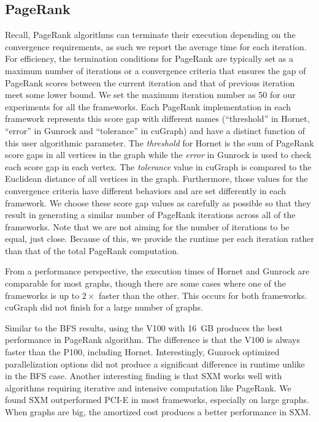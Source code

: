 \subsection{PageRank}
Recall, PageRank algorithms can terminate their execution depending on the convergence requirements, as such we report the average time for each iteration.
For efficiency, the termination conditions for PageRank are typically set as a maximum number of iterations or a convergence criteria that ensures the gap of PageRank scores between the current iteration and that of previous iteration meet some lower bound. We set the maximum iteration number as 50 for our experiments for all the frameworks.
Each PageRank implementation in each framework represents this score gap with different names (``threshold'' in Hornet, ``error'' in Gunrock and ``tolerance'' in cuGraph) and have a distinct function of this user algorithmic parameter. The \emph{threshold} for Hornet is the sum of PageRank score gaps in all vertices in the graph while the \emph{error} in Gunrock is used to check each score gap in each vertex. The \emph{tolerance} value in cuGraph is compared to the Euclidean distance of all vertices in the graph.
Furthermore, those values for the convergence criteria have different behaviors and are set differently in each framework. %
We choose these score gap values as carefully as possible so that they result in generating a similar number of PageRank iterations across all of the frameworks. Note that we are not aiming for the number of iterations to be equal, just close. Because of this, we provide the runtime per each iteration rather than that of the total PageRank computation.

From a performance perspective, the execution times of Hornet and Gunrock are comparable for most graphs, though there are some cases where one of the frameworks is up to $2\times$ faster than the other. This occurs for both frameworks. cuGraph did not finish for a large number of graphs.


Similar to the BFS results, using the V100 with 16~GB produces the best performance in PageRank algorithm. The difference is that the V100 is always faster than the P100, including Hornet. Interestingly, Gunrock optimized parallelization options did not produce a significant difference in runtime unlike in the BFS case. Another interesting finding is that SXM works well with algorithms requiring iterative and intensive computation like PageRank. We found SXM outperformed PCI-E in most frameworks, especially on large graphs. When graphs are big, the amortized cost produces a better performance in SXM\@.

